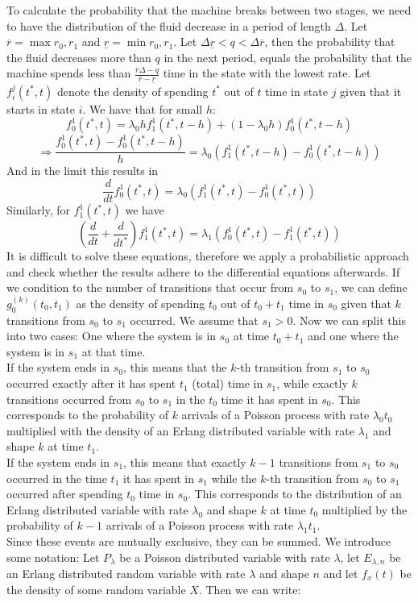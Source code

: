 To calculate the probability that the machine breaks between two stages, we need to have the distribution of the fluid decrease in a period of length $\Delta$. Let $\overline{r}=\max{r_0,r_1}$ and $\underline{r}=\min{r_0,r_1}$. Let $\Delta\underline{r}<q<\Delta\overline{r}$, then the probability that the fluid decreases more than $q$ in the next period, equals the probability that the machine spends less than $\frac{\overline{r}\Delta-q}{\overline{r}-\underline{r}}$ time in the state with the lowest rate.
Let $f_{i}^j(t^*,t)$ denote the density of spending $t^*$ out of $t$ time in state $j$ given that it starts in state $i$. We have that for small $h$:
$$
f_{0}^1(t^*,t)=\lambda_0hf_1^1(t^*,t-h)+(1-\lambda_0h)f_{0}^1(t^*,t-h)
$$
$$
\Rightarrow \frac{f_{0}^1(t^*,t)-f_{0}^1(t^*,t-h)}{h}=\lambda_0(f_1^1(t^*,t-h)-f_{0}^1(t^*,t-h))
$$
And in the limit this results in
$$
\frac{d}{dt}f_{0}^1(t^*,t)=\lambda_0(f_1^1(t^*,t)-f_{0}^1(t^*,t))
$$
Similarly, for $f_1^1(t^*,t)$ we have
$$
(\frac{d}{dt}+\frac{d}{dt^*})f_1^1(t^*,t)=\lambda_1(f_0^1(t^*,t)-f_1^1(t^*,t))
$$
It is difficult to solve these equations, therefore we apply a probabilistic approach and check whether the results adhere to the differential equations afterwards. If we condition to the number of transitions that occur from $s_0$ to $s_1$, we can define 
$
g_0^{(k)}(t_0,t_1)
$ as the density of spending $t_0$ out of $t_0+t_1$ time in $s_0$ given that $k$ transitions from $s_0$ to $s_1$ occurred. We assume that $s_1>0$. Now we can split this into two cases: One where the system is in $s_0$ at time $t_0+t_1$ and one where the system is in $s_1$ at that time. \\
If the system ends in $s_0$, this means that the $k$-th transition from $s_1$ to $s_0$ occurred exactly after it has spent $t_1$ (total) time in $s_1$, while exactly $k$ transitions occurred from $s_0$ to $s_1$ in the $t_0$ time it has spent in $s_0$. This corresponds to the probability of $k$ arrivals of a Poisson process with rate $\lambda_0t_0$ multiplied with the density of an Erlang distributed variable with rate $\lambda_1$ and shape $k$ at time $t_1$.\\
If the system ends in $s_1$, this means that exactly $k-1$ transitions from $s_1$ to $s_0$ occurred in the time $t_1$ it has spent in $s_1$ while the $k$-th transition from $s_0$ to $s_1$ occurred after spending $t_0$ time in $s_0$. This corresponds to the distribution of an Erlang distributed variable with rate $\lambda_0$ and shape $k$ at time $t_0$ multiplied by the probability of $k-1$ arrivals of a Poisson process with rate $\lambda_1t_1$.\\ Since these events are mutually exclusive, they can be summed. We introduce some notation: Let $P_{\lambda}$ be a Poisson distributed variable with rate $\lambda$, let $E_{\lambda,n}$ be an Erlang distributed random variable with rate $\lambda$ and shape $n$ and let $f_x(t)$ be the density of some random variable $X$. Then we can write:
